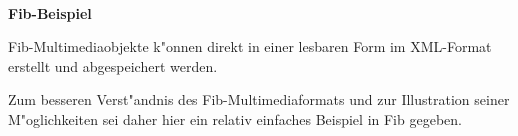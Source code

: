 \documentclass[12pt,a4paper]{article}
\begin{document}
\renewcommand{\sectionmark}[1]{\markboth{#1}{}}
\pagestyle{scrheadings} %
\ihead{} %
\ohead{} %




\ \vspace{-2.5cm}
\begin{center}
   \LARGE\bf Fib-Beispiel\\
\end{center}

\noindent
Fib-Multimediaobjekte k"onnen direkt in einer lesbaren Form im XML-Format erstellt und abgespeichert werden.

Zum besseren Verst"andnis des Fib-Multi\-media\-for\-mats und zur Illustration seiner M"oglichkeiten sei daher hier ein relativ einfaches Beispiel in Fib gegeben.
\end{document}
